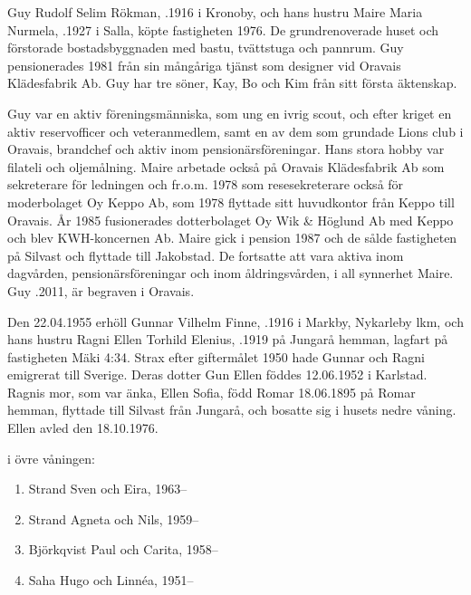 Guy Rudolf Selim Rökman, .1916 i Kronoby, och hans hustru Maire Maria Nurmela, .1927 i Salla, köpte fastigheten 1976. De grundrenoverade huset och förstorade bostadsbyggnaden med bastu, tvättstuga och pannrum. Guy pensionerades 1981 från sin mångåriga tjänst som designer vid Oravais Klädesfabrik Ab. Guy har tre söner, Kay, Bo och Kim från sitt första äktenskap.

Guy var en aktiv föreningsmänniska, som ung en ivrig scout, och efter kriget en aktiv reservofficer och veteranmedlem, samt en av dem som 	grundade Lions club i Oravais, brandchef och aktiv inom pensionärsföreningar. Hans stora hobby var filateli och oljemålning.	Maire arbetade också på Oravais Klädesfabrik Ab som sekreterare för ledningen och fr.o.m. 1978 som resesekreterare också för moderbolaget Oy Keppo Ab, som 1978 flyttade sitt huvudkontor från Keppo till Oravais. År 1985 fusionerades dotterbolaget Oy Wik \& Höglund Ab med Keppo och blev KWH-koncernen Ab. Maire gick i pension 1987 och de sålde fastigheten på Silvast och flyttade till Jakobstad. De fortsatte att vara aktiva inom	dagvården, pensionärsföreningar och inom åldringsvården, i all synnerhet Maire. Guy .2011, är begraven i Oravais.


Den 22.04.1955 erhöll Gunnar Vilhelm Finne, .1916 i Markby, Nykarleby lkm, och hans hustru Ragni Ellen Torhild Elenius, .1919 på Jungarå hemman, lagfart på fastigheten Mäki 4:34. Strax efter giftermålet 1950 hade Gunnar och Ragni emigrerat till Sverige. Deras dotter Gun Ellen föddes 12.06.1952 i Karlstad. Ragnis mor, som var änka, Ellen Sofia, född Romar 18.06.1895 på Romar hemman, flyttade till Silvast från Jungarå, och bosatte sig i husets nedre våning. Ellen avled den 18.10.1976.

 i övre våningen:
\begin{enumerate}
  \item Strand Sven och Eira,	1963--
  \item Strand Agneta och Nils, 1959--
  \item Björkqvist Paul och Carita, 1958--
  \item Saha Hugo och Linnéa,	1951--
\end{enumerate}


